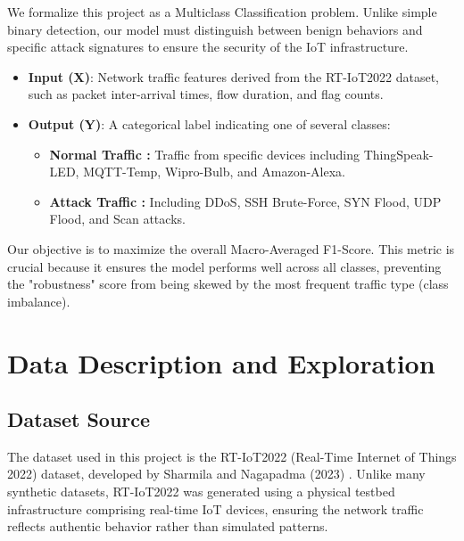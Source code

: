 \documentclass[12pt, a4paper]{article}
\begin{document}
We formalize this project as a Multiclass Classification problem. Unlike simple binary detection, our model must distinguish between benign behaviors and specific attack signatures to ensure the security of the IoT infrastructure.

\begin{itemize}
    \item \textbf{Input (X)}: Network traffic features derived from the RT-IoT2022 dataset\cite{sharmila2023quantized}, such as packet inter-arrival times, flow duration, and flag counts.
    \item \textbf{Output (Y)}: A categorical label indicating one of several classes: 
    \begin{itemize}
        \item \textbf{Normal Traffic :} Traffic from specific devices including ThingSpeak-LED, MQTT-Temp, Wipro-Bulb, and Amazon-Alexa.
        \item \textbf{Attack Traffic :} Including DDoS, SSH Brute-Force, SYN Flood, UDP Flood, and Scan attacks.
    \end{itemize}
\end{itemize}

Our objective is to maximize the overall Macro-Averaged F1-Score. This metric is crucial because it ensures the model performs well across all classes, preventing the "robustness" score from being skewed by the most frequent traffic type (class imbalance).

\section{Data Description and Exploration}

\subsection{Dataset Source}

The dataset used in this project is the RT-IoT2022 (Real-Time Internet of Things 2022) dataset, developed by Sharmila and Nagapadma (2023) \cite{sharmila2023quantized}. Unlike many synthetic datasets, RT-IoT2022 was generated using a physical testbed infrastructure comprising real-time IoT devices, ensuring the network traffic reflects authentic behavior rather than simulated patterns.
\end{document}
